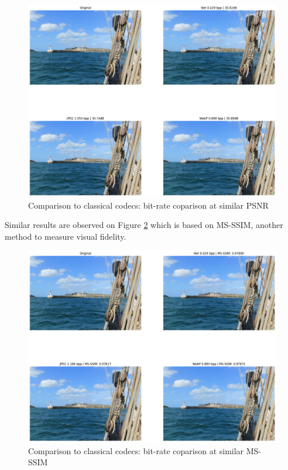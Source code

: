\begin{figure}
    \centering
    \includegraphics[width=15cm]{img/balle_repro_3.png}
    \caption{Comparison to classical codecs: bit-rate coparison at similar PSNR}
    \label{balle_repro_3}
\end{figure}

Similar results are observed on Figure \ref{balle_repro_4} which is based on MS-SSIM, another method to measure visual fidelity.

\begin{figure}
    \centering
    \includegraphics[width=15cm]{img/balle_repro_4.png}
    \caption{Comparison to classical codecs: bit-rate coparison at similar MS-SSIM}
    \label{balle_repro_4}
\end{figure}

